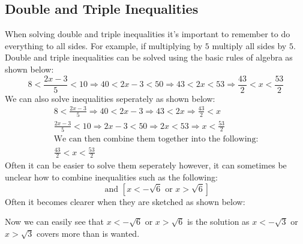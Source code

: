 \documentclass{article}
\begin{document}
\subsection{Double and Triple Inequalities}
When solving double and triple inequalities it's important to remember to do everything to all sides. For example, if multiplying
by $5$ multiply all sides by $5$.
\\
Double and triple inequalities can be solved using the basic rules of algebra as shown below:
\begin{equation}
	8 < \frac{2x - 3}{5} < 10 \Rightarrow 40 < 2x - 3 < 50 \Rightarrow 43 < 2x < 53 \Rightarrow \frac{43}{2} < x < \frac{53}{2}
\end{equation}
We can also solve inequalities seperately as shown below:
\begin{gather*}
	8 < \frac{2x - 3}{5} \Rightarrow 40 < 2x - 3 \Rightarrow 43 < 2x \Rightarrow \frac{43}{2} < x \\
	\frac{2x - 3}{5} < 10 \Rightarrow 2x - 3 < 50 \Rightarrow 2x < 53 \Rightarrow x < \frac{53}{2}\\
	\text{We can then combine them together into the following:}\\
	\frac{43}{2} < x < \frac{53}{2}
\end{gather*}
Often it can be easier to solve them seperately however, it can sometimes be unclear how to combine inequalities
such as the following:
\begin{equation}
	[x < -\sqrt{2} \text{ or } x > -\sqrt{2}]\text{ and }[x < -\sqrt{6} \text{ or } x > \sqrt{6} ]
\end{equation}
Often it becomes clearer when they are sketched as shown below:

\begin{center}
\end{center}
Now we can easily see that $x < -\sqrt{6}$ or $x > \sqrt{6}$ is the solution as $x < -\sqrt{3}$ or $x > \sqrt{3}$
covers more than is wanted.
\end{document}
